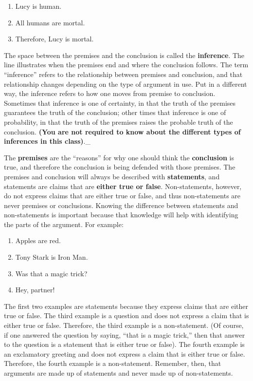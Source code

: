 \documentclass[
]{book}
\begin{document}
\begin{enumerate}
\def\labelenumi{\arabic{enumi}.}
\item
  Lucy is human.
\item
  All humans are mortal.
\item
  Therefore, Lucy is mortal.
\end{enumerate}

The space between the premises and the conclusion is called the \textbf{inference}. The line illustrates when the premises end and where the conclusion follows. The term ``inference'' refers to the relationship between premises and conclusion, and that relationship changes depending on the type of argument in use. Put in a different way, the inference refers to how one moves from premise to conclusion. Sometimes that inference is one of certainty, in that the truth of the premises guarantees the truth of the conclusion; other times that inference is one of probability, in that the truth of the premises raises the probable truth of the conclusion. \textbf{(You are not required to know about the different types of inferences in this class)}.\_

The \textbf{premises} are the ``reasons'' for why one should think the \textbf{conclusion} is true, and therefore the conclusion is being defended with those premises. The premises and conclusion will always be described with \textbf{statements}, and statements are claims that are \textbf{either true or false}. Non-statements, however, do not express claims that are either true or false, and thus non-statements are never premises or conclusions. Knowing the difference between statements and non-statements is important because that knowledge will help with identifying the parts of the argument. For example:

\begin{enumerate}
\def\labelenumi{\arabic{enumi}.}
\item
  Apples are red.
\item
  Tony Stark is Iron Man.
\item
  Was that a magic trick?
\item
  Hey, partner!
\end{enumerate}

The first two examples are statements because they express claims that are either true or false. The third example is a question and does not express a claim that is either true or false. Therefore, the third example is a non-statement. (Of course, if one answered the question by saying, ``that is a magic trick,'' then that answer to the question is a statement that is either true or false). The fourth example is an exclamatory greeting and does not express a claim that is either true or false. Therefore, the fourth example is a non-statement. Remember, then, that arguments are made up of statements and never made up of non-statements.
\end{document}

